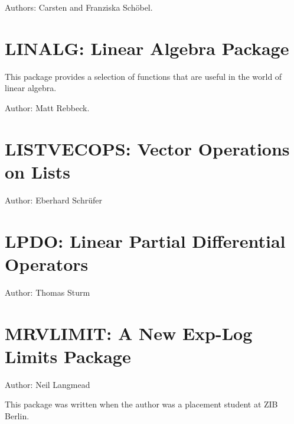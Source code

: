 Authors: Carsten and Franziska Sch\"obel.



\newpage

\iffalse
\section{LIMITS: A Package for Finding Limits}
\indexpackage{LIMITS}


This package loads automatically.

Author: Stanley L. Kameny.


\fi

\newpage

\section{LINALG: Linear Algebra Package}
\label{LINALG}

This package provides a selection of functions that are useful
in the world of linear algebra.

Author: Matt Rebbeck.



\newpage

\section{LISTVECOPS: Vector Operations on Lists}
\label{LISTVECOPS}

Author: Eberhard Schr\"{u}fer



\newpage

\section{LPDO: Linear Partial Differential Operators}
\label{LPDO}

Author: Thomas Sturm



\newpage

\section{MRVLIMIT: A New Exp-Log Limits Package}

Author: Neil Langmead

This package was written when the author was a placement student at ZIB Berlin.


